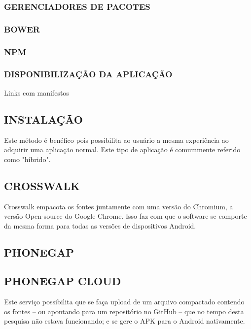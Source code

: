 \documentclass[11pt,a4paper]{article}
\begin{document}
\subsubsection{GERENCIADORES DE PACOTES}

\subsubsection{BOWER}


\subsubsection{NPM}


\subsubsection{DISPONIBILIZAÇÃO DA APLICAÇÃO}

Links com manifestos

\subsection{ INSTALAÇÃO}

Este método é benéfico pois possibilita ao usuário a mesma
experiência ao adquirir uma aplicação normal. Este tipo de
aplicação é comummente referido como "híbrido".

\subsection{ CROSSWALK}

Crosswalk empacota os fontes juntamente com uma versão do Chromium, a
versão Open-source do Google Chrome. Isso faz com que o software se
comporte da mesma forma para todas as versões de dispositivos Android.

\subsection{ PHONEGAP}

\subsection{ PHONEGAP CLOUD}

Este serviço possibilita que se faça upload de um arquivo compactado
contendo os fontes – ou apontando para um repositório no GitHub –
que no tempo desta pesquisa não estava funcionando; e se gere o APK
para o Android nativamente.
\end{document}
